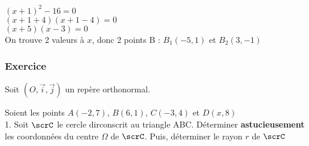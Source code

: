 $ \left(x+1\right)^2  -16 = 0 $\\

$ \left(x + 1 + 4\right)\left(x+1-4\right) = 0 $\\

$ \left(x+5\right)\left(x-3\right) = 0 $\\

On trouve 2 valeurs à $x$, donc 2 points B : $B_1 \left(-5,1\right)$ et $B_2\left(3,-1\right)$\\


\newpage
\subsubsection{Exercice }

Soit $\left(O, \vec{i}, \vec{j}\right)$ un repère orthonormal.

Soient les points $A\left(-2,7\right)$, $B\left(6,1\right)$, $C\left(-3,4\right)$ et $D\left(x,8\right)$\\


1. Soit $\scrC$ le cercle dirconscrit au triangle ABC. Déterminer \textbf{astucieusement} les coordonnées du centre $\Omega$ de $\scrC$. Puis, déterminer le rayon $r$ de $\scrC$\\

